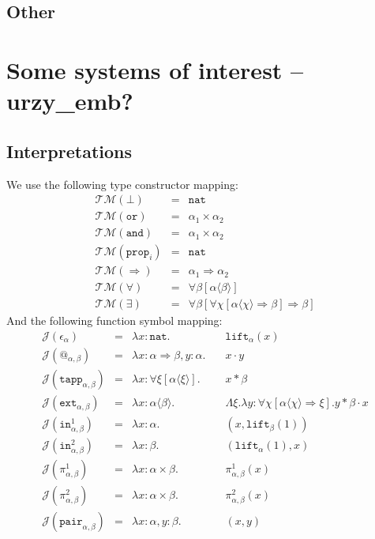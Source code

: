 \documentclass[runningheads,a4paper]{llncs}
\newcommand{\Typemap}{\mathcal{T\!M}}
\newcommand{\Termmap}{\mathcal{J}}
\newcommand{\quant}[2]{\forall #1[#2]}
\newcommand{\arrtype}{\Rightarrow}
\newcommand{\abs}[2]{\lambda #1.#2}
\newcommand{\tabs}[2]{\Lambda #1.#2}
\newcommand{\nat}{\mathtt{nat}}
\begin{document}
\subsection{Other}

\section{Some systems of interest -- urzy\_emb?}

\subsection{Interpretations}

We use the following type constructor mapping:
\[
\begin{array}{rcl}
\Typemap(\bot) & = & \nat \\
\Typemap(\mathtt{or}) & = & \alpha_1 \times \alpha_2 \\
\Typemap(\mathtt{and}) & = & \alpha_1 \times \alpha_2 \\
\Typemap(\mathtt{prop}_i) & = & \nat \\
\Typemap(\arrtype) & = & \alpha_1 \arrtype \alpha_2 \\
\Typemap(\forall) & = & \quant{\beta}{\alpha\langle\beta\rangle} \\
\Typemap(\exists) & = & \quant{\beta}{\quant{\chi}{\alpha\langle\chi
  \rangle \arrtype \beta} \arrtype \beta}
\end{array}
\]
And the following function symbol mapping:
\[
\begin{array}{rcll}
\Termmap(\epsilon_\alpha) & = & \lambda x:\nat. & 
  \mathtt{lift}_\alpha(x) \\
\Termmap(@_{\alpha,\beta}) & = & \lambda x: \alpha \arrtype \beta,y :
  \alpha. \quad & x \cdot y \\
\Termmap(\mathtt{tapp}_{\alpha,\beta}) & = & \lambda x : \quant{\xi}{
  \alpha\langle\xi\rangle}.\quad & x * \beta \\
\Termmap(\mathtt{ext}_{\alpha,\beta}) & = & \lambda x:\alpha\langle\beta
  \rangle. &
  \tabs{\xi}{\abs{y:\quant{\chi}{\alpha\langle\chi\rangle
  \arrtype \xi}}{y * \beta \cdot x}} \\
\Termmap(\mathtt{in}^1_{\alpha,\beta}) & = & \lambda x : \alpha.\quad &
  (x, \mathtt{lift}_\beta(1)) \\
\Termmap(\mathtt{in}^2_{\alpha,\beta}) & = & \lambda x : \beta.\quad &
  (\mathtt{lift}_\alpha(1), x) \\
\Termmap(\pi^1_{\alpha,\beta}) & = & \lambda x : \alpha \times \beta.
  \quad & \pi^1_{\alpha,\beta}(x) \\
\Termmap(\pi^2_{\alpha,\beta}) & = & \lambda x : \alpha \times \beta.
  \quad & \pi^2_{\alpha,\beta}(x) \\
\Termmap(\mathtt{pair}_{\alpha,\beta}) & = & \lambda x : \alpha, y :
  \beta.\quad & (x, y) \\
\end{array}
\]
\end{document}
